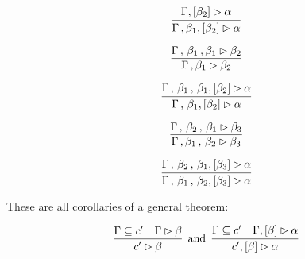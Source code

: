 \smallskip

\begin{theorem}
\label{thm:bc_weakening}
$$
\vcenter{\infer{\bchsl[\dyncon{} \, , \beta_1]{\beta_2}{\alpha}}{\bchsl{\beta_2}{\alpha}}}
$$
\end{theorem}

\smallskip

\begin{theorem}
$$
\vcenter{\infer{\seqsl[\dyncon{} \, , \beta_1]{\beta_2}}{\seqsl[\dyncon{} \, , \, \beta_1 \, , \beta_1]{\beta_2}}}
$$
\end{theorem}

\smallskip

\begin{theorem}
$$
\vcenter{\infer{\bchsl[\dyncon{} \, , \, \beta_1]{\beta_2}{\alpha}}{\bchsl[\dyncon{} \, , \, \beta_1 \, , \, \beta_1]{\beta_2}{\alpha}}}
$$
\end{theorem}

\smallskip

\begin{theorem}
$$
\vcenter{\infer{\seqsl[\dyncon{} \, , \beta_1 \, , \, \beta_2]{\beta_3}}{\seqsl[\dyncon{} \, , \, \beta_2 \, , \, \beta_1]{\beta_3}}}
$$
\end{theorem}

\smallskip

\begin{theorem}
$$
\vcenter{\infer{\bchsl[\dyncon{} \, , \, \beta_1 \, , \, \beta_2]{\beta_3}{\alpha}}{\bchsl[\dyncon{} \, , \, \beta_2 \, , \, \beta_1]{\beta_3}{\alpha}}}
$$
\end{theorem}

\bigskip

\noindent These are all corollaries of a general theorem:

\begin{theorem}
$$
\vcenter{\infer{\seqsl[\inddyncon{}]{\beta}}{\dyncon{} \subseteq \inddyncon{} & \seqsl[\dyncon{}]{\beta}}} \;\; \mathrm{and} \;\; \vcenter{\infer{\bchsl[\inddyncon{}]{\beta}{\alpha}}{\dyncon{} \subseteq \inddyncon{} & \bchsl[\dyncon{}]{\beta}{\alpha}}}
$$
\label{thm:monotone}
\end{theorem}

